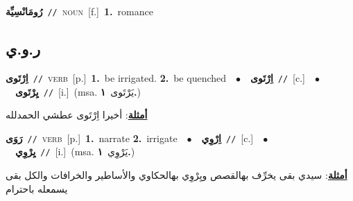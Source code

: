 \documentclass[10pt,a4paper,twoside]{article} %
\begin{document}
\begin{multicols}{2}
{\setlength\topsep{0pt}\textbf{\foreignlanguage{arabic}{رُومَانْسِيِّة}}\ {\color{gray}\texttt{//}\color{black}}\ \textsc{noun}\ [f.]\ \textbf{1.}~romance\ } \vspace{2mm}

\vspace{-3mm}
\subsection*{\color{blue}\foreignlanguage{arabic}{ر.و.ي}\color{blue}{}} 

{\setlength\topsep{0pt}\textbf{\foreignlanguage{arabic}{اِرْتَوى}}\ {\color{gray}\texttt{//}\color{black}}\ \textsc{verb}\ [p.]\ \textbf{1.}~be irrigated.  \textbf{2.}~be quenched\ \ $\bullet$\ \ \setlength\topsep{0pt}\textbf{\foreignlanguage{arabic}{اِرْتَوى}}\ {\color{gray}\texttt{//}\color{black}}\ [c.]\ \ $\bullet$\ \ \setlength\topsep{0pt}\textbf{\foreignlanguage{arabic}{يِرْتَوى}}\ {\color{gray}\texttt{//}\color{black}}\ [i.]\ \color{gray}(msa. \foreignlanguage{arabic}{يَرْتَوى}~\foreignlanguage{arabic}{\textbf{١.}})\color{black}\  \begin{flushright}\color{gray}\foreignlanguage{arabic}{\textbf{\underline{\foreignlanguage{arabic}{أمثلة}}}: أخيرا اِرْتَوى عطشي الحمدلله}\end{flushright}\color{black}} \vspace{2mm}

{\setlength\topsep{0pt}\textbf{\foreignlanguage{arabic}{رَوَى}}\ {\color{gray}\texttt{//}\color{black}}\ \textsc{verb}\ [p.]\ \textbf{1.}~narrate  \textbf{2.}~irrigate\ \ $\bullet$\ \ \setlength\topsep{0pt}\textbf{\foreignlanguage{arabic}{اِرْوِي}}\ {\color{gray}\texttt{//}\color{black}}\ [c.]\ \ $\bullet$\ \ \setlength\topsep{0pt}\textbf{\foreignlanguage{arabic}{يِرْوِي}}\ {\color{gray}\texttt{//}\color{black}}\ [i.]\ \color{gray}(msa. \foreignlanguage{arabic}{يَرْوِي}~\foreignlanguage{arabic}{\textbf{١.}})\color{black}\  \begin{flushright}\color{gray}\foreignlanguage{arabic}{\textbf{\underline{\foreignlanguage{arabic}{أمثلة}}}: سيدي بقى يخرِّف بهالقصص ويِرْوِي بهالحكاوي والأساطير والخرافات والكل بقى يسمعله باحترام}\end{flushright}\color{black}} \vspace{2mm}


\end{multicols}
\end{document}
